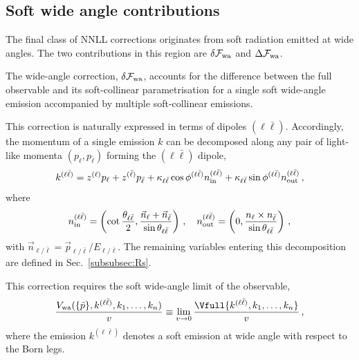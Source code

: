 \subsection{Soft wide angle contributions}
\label{sec:wa-contributions}

The final class of NNLL corrections originates from soft radiation
emitted at wide angles. The two contributions in this region are
$\delta\mathcal{F}_{\rm wa}$ and $\Delta\mathcal{F}_{\rm wa}$.

The wide-angle correction, $\delta\mathcal{F}_{\rm wa}$,
accounts for the difference between the full observable and its
soft-collinear parametrisation for a single soft wide-angle emission
accompanied by multiple soft-collinear emissions.

This correction  is naturally expressed in
terms of dipoles $(\ell\bar\ell)$. Accordingly, the momentum
of a single emission $k$ can be decomposed along any pair of light-like 
momenta $(p_{\ell},p_{\bar \ell})$ forming the $(\ell \bar\ell)$ dipole,
\begin{equation}
\label{eq:Sudakov-decomp}
k^{(\ell\bar\ell)}=z^{(\ell)}p_{\ell}+z^{(\bar\ell)}p_{\bar\ell}+\kappa_{\ell\bar\ell}\cos\phi^{(\ell\bar\ell)}n_{\rm{in}}^{(\ell\bar\ell)}+\kappa_{\ell\bar\ell}\sin\phi^{(\ell\bar\ell)}n_{\rm{out}}^{(\ell\bar\ell)}\,,
\end{equation}
where
\begin{equation}
	n_{\rm in}^{(\ell\bar\ell)}=\left(\cot\frac{\theta_{\ell\bar\ell}}{2},\frac{\vec{n}_{\ell}+\vec{n}_{\bar\ell}}{\sin\theta_{\ell\bar\ell}}\right)\,,\quad n_{\rm out}^{(\ell\bar\ell)}=\left(0,\frac{n_{\ell}\times n_{\bar\ell}}{\sin\theta_{\ell\bar\ell}}\right)\,,
	\end{equation}
with $\vec n_{\ell/\bar\ell}=\vec p_{\ell/\bar\ell}/E_{\ell/\bar\ell}$.
The remaining variables entering this decomposition are defined in
Sec.~\ref{subsubsec:Rs}.

This correction requires the soft wide-angle limit of the observable,
\begin{equation}
  \label{eq:Vwa}
  \frac{V_{\mathrm{wa}}(\{\tilde{p}\}, k^{(\ell\bar{\ell})}, k_1,\dots,k_n)}{v}\equiv \lim_{v\to 0}\frac{\Vfull{k^{(\ell\bar{\ell})}, k_1,\dots,k_n}}{v}\,,
\end{equation}
where the emission $k^{(\ell\bar\ell)}$ denotes a soft emission at wide angle with
respect to the Born legs.

